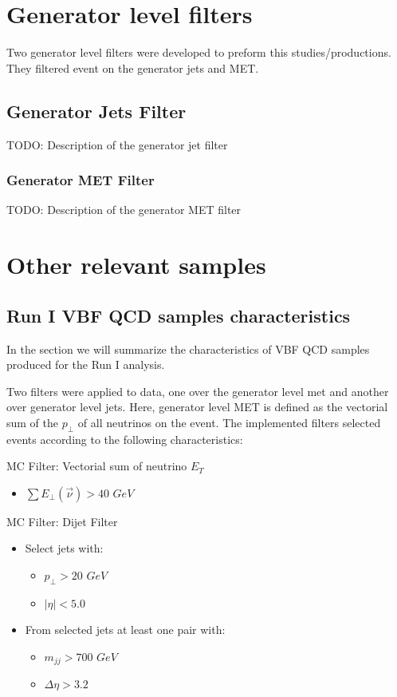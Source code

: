 \documentclass[a4paper]{article}
\begin{document}
\section{Generator level filters}

Two generator level filters were developed to preform this studies/productions. They filtered event on the generator jets and MET.

\subsection{Generator Jets Filter}

TODO: Description of the generator jet filter

\subsubsection{Generator MET Filter}

TODO: Description of the generator MET filter 

\section{Other relevant samples}

\subsection{Run I VBF QCD samples characteristics}

In the section we will summarize the characteristics of VBF QCD samples produced for the Run I analysis.

Two filters were applied to data, one over the generator level met and another over generator level jets. Here, generator level MET is defined as the vectorial sum of the $p_\perp$ of all neutrinos on the event. The implemented filters selected events according to the following characteristics:

MC Filter: Vectorial sum of neutrino $E_T$
\begin{itemize}
  \item $\sum E_\perp(\vec{\nu}) > 40$ $GeV$
\end{itemize}

MC Filter: Dijet Filter
\begin{itemize}
  \item Select jets with:
  \begin{itemize}
    \item $p_\perp>20$ $GeV$
    \item $|\eta|<5.0$
  \end{itemize}
  \item From selected jets at least one pair with:
  \begin{itemize}
    \item $m_{jj}>700$ $GeV$
    \item $\Delta\eta>3.2$
  \end{itemize}    
\end{itemize}
\end{document}
